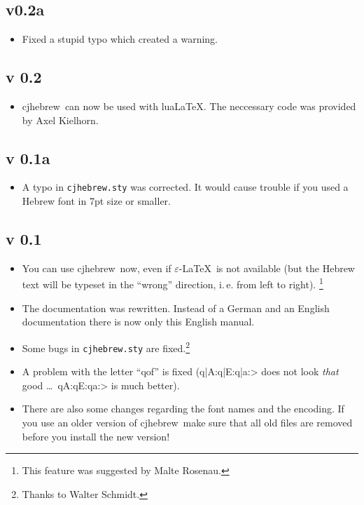 \documentclass[a4paper,10pt]{article}
\def\cjh{\textsf{cjhebrew}}
\def\!#1!{\texttt{#1}}
\newcommand{\eLaTeX}{$\varepsilon$-\LaTeX}
\begin{document}
\subsection*{v0.2a}

\begin{itemize}
\item Fixed a stupid typo which created a warning.
\end{itemize}

\subsection*{v 0.2}

\begin{itemize}
\item \cjh\ can now be used with lua\LaTeX.  The neccessary code was
  provided by Axel Kielhorn.
\end{itemize}

\subsection*{v 0.1a}

\begin{itemize}

    \item A typo in \!cjhebrew.sty! was corrected. It would cause
    trouble if you used a Hebrew font in 7pt size or smaller.

\end{itemize}


\subsection*{v 0.1}

\begin{itemize}

    \item You can use \cjh\ now, even if \eLaTeX\ is not available
        (but the  Hebrew text will be typeset in the ``wrong''
        direction, i.\,e. from left to right).%
            \footnote{This feature was suggested by Malte
            Rosenau.}

    \item The documentation was rewritten. Instead of a German and
        an English documentation there is now only this English
        manual.

    \item Some bugs in \!cjhebrew.sty! are fixed.\footnote{Thanks to Walter Schmidt.}

    \item A problem with the letter ``qof'' is fixed (\<q|A:q|E:q|a:>
        does not look \textit{that} good \ldots\ \<qA:qE:qa:> is much better).

    \item There are also some changes regarding the font names and
        the encoding. If you use an older version of
        \cjh\ make sure that all old files are removed before you
        install the new version!

\end{itemize}
\end{document}
